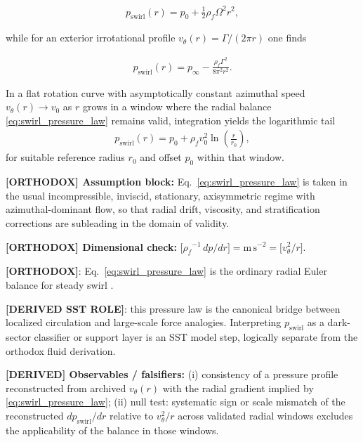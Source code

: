 \documentclass[11pt]{article}
\theoremstyle{definition}
\theoremstyle{plain}
\theoremstyle{remark}
\newcommand{\rhoF}{{\rho_{\!f}}}
\begin{document}
        \begin{align}
            p_{\mathrm{swirl}}(r) = p_0 + \frac{1}{2}\rhoF \Omega^2 r^2,
            \label{eq:swirl_pressure_rigid}
        \end{align}

        while for an exterior irrotational profile $v_\theta(r)=\Gamma/(2\pi r)$ one finds

        \begin{align}
            p_{\mathrm{swirl}}(r) = p_\infty - \frac{\rhoF\Gamma^2}{8\pi^2 r^2}.
            \label{eq:swirl_pressure_irrotational}
        \end{align}

        In a flat rotation curve with asymptotically constant azimuthal speed $v_\theta(r)\to v_0$ as $r$ grows in a window where the radial balance \eqref{eq:swirl_pressure_law} remains valid, integration yields the logarithmic tail
        \begin{align}
            p_{\mathrm{swirl}}(r)
            =
            p_0 + \rhoF v_0^2 \ln\!\left(\frac{r}{r_0}\right),
            \label{eq:swirl_pressure_flat_tail}
        \end{align}
        for suitable reference radius $r_0$ and offset $p_0$ within that window.

        \textbf{[ORTHODOX] Assumption block:} Eq.~\eqref{eq:swirl_pressure_law} is taken in the usual incompressible, inviscid, stationary, axisymmetric regime with azimuthal-dominant flow, so that radial drift, viscosity, and stratification corrections are subleading in the domain of validity.

        \textbf{[ORTHODOX] Dimensional check:}
        $\bigl[\rhoF^{-1}\,dp/dr\bigr]=\mathrm{m\,s^{-2}}=\bigl[v_\theta^2/r\bigr]$.

        \textbf{[ORTHODOX]}: Eq.~\eqref{eq:swirl_pressure_law} is the ordinary radial Euler balance for steady swirl \cite{Batchelor1967,Saffman1992}.

        \textbf{[DERIVED SST ROLE]}: this pressure law is the canonical bridge between localized circulation and large-scale force analogies. Interpreting $p_{\mathrm{swirl}}$ as a dark-sector classifier or support layer is an SST model step, logically separate from the orthodox fluid derivation.

        \textbf{[DERIVED] Observables / falsifiers:} (i) consistency of a pressure profile reconstructed from archived $v_\theta(r)$ with the radial gradient implied by \eqref{eq:swirl_pressure_law}; (ii) null test: systematic sign or scale mismatch of the reconstructed $dp_{\mathrm{swirl}}/dr$ relative to $v_\theta^2/r$ across validated radial windows excludes the applicability of the balance in those windows.
\end{document}

